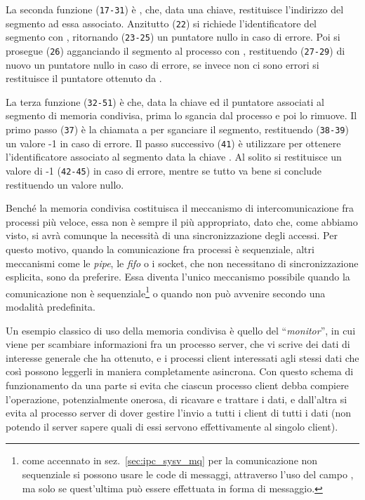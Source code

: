 La seconda funzione (\texttt{\small 17-31}) è , che, data una
chiave, restituisce l'indirizzo del segmento ad essa associato. Anzitutto
(\texttt{\small 22}) si richiede l'identificatore del segmento con
, ritornando (\texttt{\small 23-25}) un puntatore nullo in caso
di errore. Poi si prosegue (\texttt{\small 26}) agganciando il segmento al
processo con , restituendo (\texttt{\small 27-29}) di nuovo un
puntatore nullo in caso di errore, se invece non ci sono errori si restituisce
il puntatore ottenuto da .

La terza funzione (\texttt{\small 32-51}) è  che, data la
chiave ed il puntatore associati al segmento di memoria condivisa, prima lo
sgancia dal processo e poi lo rimuove. Il primo passo (\texttt{\small 37}) è
la chiamata a  per sganciare il segmento, restituendo
(\texttt{\small 38-39}) un valore -1 in caso di errore. Il passo successivo
(\texttt{\small 41}) è utilizzare  per ottenere l'identificatore
associato al segmento data la chiave . Al solito si restituisce un
valore di -1 (\texttt{\small 42-45}) in caso di errore, mentre se tutto va
bene si conclude restituendo un valore nullo.

Benché la memoria condivisa costituisca il meccanismo di intercomunicazione
fra processi più veloce, essa non è sempre il più appropriato, dato che, come
abbiamo visto, si avrà comunque la necessità di una sincronizzazione degli
accessi.  Per questo motivo, quando la comunicazione fra processi è
sequenziale, altri meccanismi come le \textit{pipe}, le \textit{fifo} o i
socket, che non necessitano di sincronizzazione esplicita, sono da
preferire. Essa diventa l'unico meccanismo possibile quando la comunicazione
non è sequenziale\footnote{come accennato in sez.~\ref{sec:ipc_sysv_mq} per la
  comunicazione non sequenziale si possono usare le code di messaggi,
  attraverso l'uso del campo , ma solo se quest'ultima può essere
  effettuata in forma di messaggio.} o quando non può avvenire secondo una
modalità predefinita.

Un esempio classico di uso della memoria condivisa è quello del
``\textit{monitor}'', in cui viene per scambiare informazioni fra un processo
server, che vi scrive dei dati di interesse generale che ha ottenuto, e i
processi client interessati agli stessi dati che così possono leggerli in
maniera completamente asincrona.  Con questo schema di funzionamento da una
parte si evita che ciascun processo client debba compiere l'operazione,
potenzialmente onerosa, di ricavare e trattare i dati, e dall'altra si evita
al processo server di dover gestire l'invio a tutti i client di tutti i dati
(non potendo il server sapere quali di essi servono effettivamente al singolo
client).

